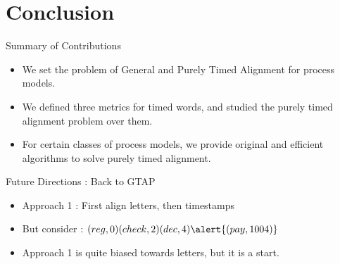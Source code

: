 \documentclass[10pt]{beamer}
\begin{document}


\section{Conclusion}
\begin{frame}{Summary of Contributions}
\begin{itemize}
	\item We set the problem of General and Purely Timed Alignment for process models. 
	\vfill 
	\item We defined three metrics for timed words, and studied the purely timed alignment problem over them.  
	\vfill 
	\item For certain classes of process models, we provide original and efficient algorithms to solve purely timed alignment.

\end{itemize}
\end{frame}


\begin{frame}[fragile]{Future Directions : Back to GTAP}
	\begin{itemize}
		\item Approach 1 : First align letters, then timestamps
		\vfill 
		\item But consider : $(reg, 0)(check, 2)(dec, 4)\alert{(pay, 1004)}$
		
		\vfill
		
		
	\vfill 
		\item Approach 1 is quite biased towards letters, but it is a start. 
	\end{itemize}
\end{frame}
\end{document}
